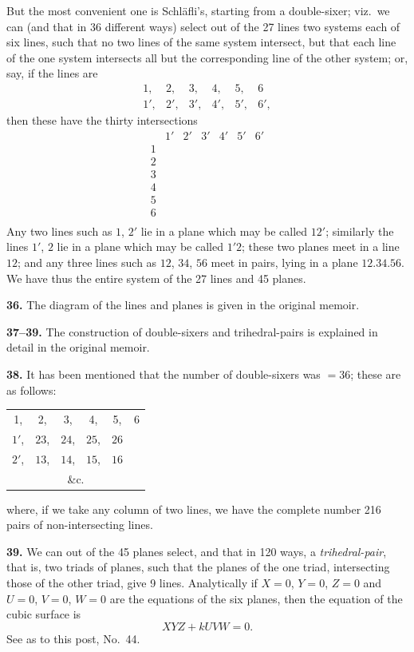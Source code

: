 \documentclass[11pt,a4paper]{article}
\theoremstyle{definition}
\begin{document}
But the most convenient one is Schl\"afli's, starting from a double-sixer; viz.\ we can (and that in 36 different ways) select out of the 27 lines two systems each of six lines, such that no two lines of the same system intersect, but that each line of the one system intersects all but the corresponding line of the other system; or, say, if the lines are
\[
\begin{array}{cccccc}
1, & 2, & 3, & 4, & 5, & 6 \\
1', & 2', & 3', & 4', & 5', & 6',
\end{array}
\]
then these have the thirty intersections
\[
\begin{array}{c|cccccc}
 & 1' & 2' & 3' & 4' & 5' & 6' \\ \hline
1 & & & & & & \\
2 & & & & & & \\
3 & & & & & & \\
4 & & & & & & \\
5 & & & & & & \\
6 & & & & & & \\
\end{array}
\]
Any two lines such as $1$, $2'$ lie in a plane which may be called $12'$; similarly the lines $1'$, $2$ lie in a plane which may be called $1'2$; these two planes meet in a line $12$; and any three lines such as $12$, $34$, $56$ meet in pairs, lying in a plane $12.34.56$. We have thus the entire system of the 27 lines and 45 planes.

\textbf{36.} The diagram of the lines and planes is given in the original memoir.

\textbf{37--39.} The construction of double-sixers and trihedral-pairs is explained in detail in the original memoir.

\textbf{38.} It has been mentioned that the number of double-sixers was $= 36$; these are as follows:
\begin{center}
\begin{tabular}{cccccc}
1, & 2, & 3, & 4, & 5, & 6 \\
$1'$, & $23$, & $24$, & $25$, & $26$ & \\
$2'$, & $13$, & $14$, & $15$, & $16$ & \\
\multicolumn{6}{c}{\&c.}
\end{tabular}
\end{center}
where, if we take any column of two lines, we have the complete number 216 pairs of non-intersecting lines.

\textbf{39.} We can out of the 45 planes select, and that in 120 ways, a \textit{trihedral-pair}, that is, two triads of planes, such that the planes of the one triad, intersecting those of the other triad, give 9 lines. Analytically if $X = 0$, $Y = 0$, $Z = 0$ and $U = 0$, $V = 0$, $W = 0$ are the equations of the six planes, then the equation of the cubic surface is
\[
XYZ + kUVW = 0.
\]
See as to this post, No.~44.
\end{document}
